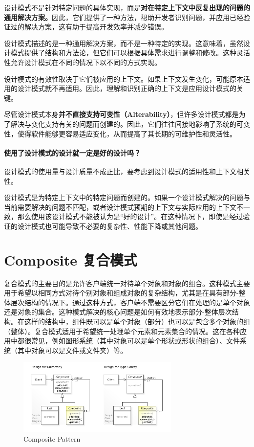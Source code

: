 设计模式不是针对特定问题的具体实现，而是\textbf{对在特定上下文中反复出现的问题的通用解决方案。}因此，它们提供了一种方法，帮助开发者识别问题，并应用已经验证过的解决方案，这有助于提高开发效率并减少错误。

设计模式描述的是一种通用解决方案，而不是一种特定的实现。这意味着，虽然设计模式提供了结构和方法论，但它们可以根据具体需求进行调整和修改。这种灵活性允许设计模式在不同的情况下以不同的方式实现。

设计模式的有效性取决于它们被应用的上下文。如果上下文发生变化，可能原本适用的设计模式就不再适用。因此，理解和识别正确的上下文是应用设计模式的关键。

尽管设计模式本身\textbf{并不直接支持可变性（Alterability）}，但许多设计模式都是为了解决与变化支持有关的问题而创建的。因此，它们往往间接地影响了系统的可变性，使得软件能够更容易适应变化，从而提高了其长期的可维护性和灵活性。


\paragraph{使用了设计模式的设计就一定是好的设计吗？}设计模式的使用量与设计质量不成正比，要考虑到设计模式的适用性和上下文相关性。

设计模式是为特定上下文中的特定问题而创建的。如果一个设计模式解决的问题与当前需要解决的问题不匹配，或者设计模式预期的上下文与实际应用的上下文不一致，那么使用该设计模式不能被认为是“好的设计”。在这种情况下，即使是经过验证的设计模式也可能导致不必要的复杂性、性能下降或其他问题。

\section{Composite 复合模式}

复合模式的主要目的是允许客户端统一对待单个对象和对象的组合。这种模式主要用于希望以相同方式对待个别对象和组成对象的复杂结构，尤其是在具有部分-整体层次结构的情况下。通过这种方式，客户端不需要区分它们在处理的是单个对象还是对象的集合。这种模式解决的核心问题是如何有效地表示部分-整体层次结构。在这样的结构中，组件既可以是单个对象（部分）也可以是包含多个对象的组（整体）。复合模式适用于希望统一处理单个元素和元素集合的情况。这在各种应用中都很常见，例如图形系统（其中对象可以是单个形状或形状的组合）、文件系统（其中对象可以是文件或文件夹）等。

\begin{figure}[h]
    \centering
    \includegraphics[width=8cm]{res/W3sDesign_Composite_Design_Pattern_Type_Safety_UML.jpg}
    \caption{Composite Pattern}
\end{figure}


